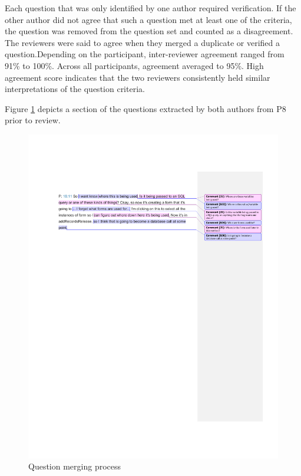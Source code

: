 \documentclass[conference]{IEEEtran}
\begin{document}
Each question that was only identified by one author required verification.
If the other author did not agree that such a question met at least one of the criteria, the question was removed from the question set and counted as a disagreement.
The reviewers were said to agree when they merged a duplicate or verified a question.Depending on the participant, inter-reviewer agreement ranged from 91\% to 100\%. Across all participants, agreement averaged to 95\%.
High agreement score indicates that the two reviewers consistently held similar interpretations of the question criteria.


Figure \ref{fig:merging} depicts a section of the questions extracted by both authors from P8 prior to review.

\begin{figure}
\centering
\includegraphics[width=7.5in]{Images/QuestionMerging}
\caption{Question merging process}
\label{fig:merging} 
\end{figure}
\end{document}
